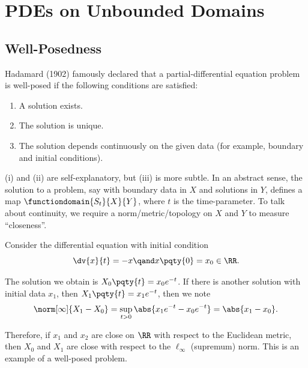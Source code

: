 \section{PDEs on Unbounded Domains}

\subsection{Well-Posedness}

Hadamard (1902) famously declared that a partial-differential equation problem is well-posed if the following conditions are satisfied:
\begin{enumerate}[label=(\roman*)]
    \item A solution exists.
    \item The solution is unique.
    \item The solution depends continuously on the given data (for example, boundary and initial conditions).
\end{enumerate}

(i) and (ii) are self-explanatory, but (iii) is more subtle. In an abstract sense, the solution to a problem, say with boundary data in \(X\) and solutions in \(Y\), defines a map \(\functiondomain{S_t}{X}{Y}\), where \(t\) is the time-parameter. To talk about continuity, we require a norm/metric/topology on \(X\) and \(Y\) to measure ``closeness''.

\begin{example}
    Consider the differential equation with initial condition
    \begin{equation}
        \dv{x}{t} = -x \qand x\pqty{0} = x_0 \in \RR.
    \end{equation}

    The solution we obtain is \(X_0 \pqty{t} = x_0 e^{-t}\). If there is another solution with initial data \(x_1\), then \(X_1 \pqty{t} = x_1 e^{-t}\), then we note
    \begin{equation}
        \norm[\infty]{X_1 - X_0} = \sup_{t > 0} \abs{x_1 e^{-t} - x_0 e^{-t}} = \abs{x_1 - x_0}.
    \end{equation}

    Therefore, if \(x_1\) and \(x_2\) are close on \(\RR\) with respect to the Euclidean metric, then \(X_0\) and \(X_1\) are close with respect to the \(\ell_{\infty}\) (supremum) norm. This is an example of a well-posed problem.
\end{example}

